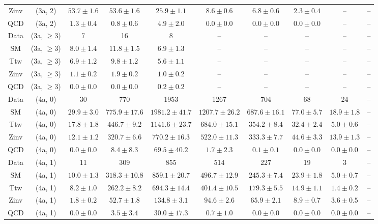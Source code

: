 \begin{table}[h!]
{\begin{tabular}{cccccccccc}
	Zinv & (3a, 2) & $53.7\pm 1.6$ & $53.6\pm 1.6$ & $25.9\pm 1.1$ & $8.6\pm 0.6$ & $6.8\pm 0.6$ & $2.3\pm 0.4$ & -- & -- \\[0.5ex] 
	QCD & (3a, 2) & $1.3\pm 0.4$ & $0.8\pm 0.6$ & $4.9\pm 2.0$ & $0.0\pm 0.0$ & $0.0\pm 0.0$ & $0.0\pm 0.0$ & -- & -- \\[0.5ex] 
	Data & (3a, $\ge3$) & 7 & 16 & 8 & -- & -- & -- & -- & -- \\[0.5ex] 
	SM & (3a, $\ge3$) & $8.0\pm 1.4$ & $11.8\pm 1.5$ & $6.9\pm 1.3$ & -- & -- & -- & -- & -- \\[0.5ex] 
	Ttw & (3a, $\ge3$) & $6.9\pm 1.2$ & $9.8\pm 1.2$ & $5.6\pm 1.1$ & -- & -- & -- & -- & -- \\[0.5ex] 
	Zinv & (3a, $\ge3$) & $1.1\pm 0.2$ & $1.9\pm 0.2$ & $1.0\pm 0.2$ & -- & -- & -- & -- & -- \\[0.5ex] 
	QCD & (3a, $\ge3$) & $0.0\pm 0.0$ & $0.0\pm 0.0$ & $0.2\pm 0.2$ & -- & -- & -- & -- & -- \\[0.5ex] 
	Data & (4a, 0) & 30 & 770 & 1953 & 1267 & 704 & 68 & 24 & -- \\[0.5ex] 
	SM & (4a, 0) & $29.9\pm 3.0$ & $775.9\pm 17.6$ & $1981.2\pm 41.7$ & $1207.7\pm 26.2$ & $687.6\pm 16.1$ & $77.0\pm 5.7$ & $18.9\pm 1.8$ & -- \\[0.5ex] 
	Ttw & (4a, 0) & $17.8\pm 1.8$ & $446.7\pm 9.2$ & $1141.6\pm 23.7$ & $684.0\pm 15.1$ & $354.2\pm 8.4$ & $32.4\pm 2.4$ & $5.0\pm 0.6$ & -- \\[0.5ex] 
	Zinv & (4a, 0) & $12.1\pm 1.2$ & $320.7\pm 6.6$ & $770.2\pm 16.3$ & $522.0\pm 11.3$ & $333.3\pm 7.7$ & $44.6\pm 3.3$ & $13.9\pm 1.3$ & -- \\[0.5ex] 
	QCD & (4a, 0) & $0.0\pm 0.0$ & $8.4\pm 8.3$ & $69.5\pm 40.2$ & $1.7\pm 2.3$ & $0.1\pm 0.1$ & $0.0\pm 0.0$ & $0.0\pm 0.0$ & -- \\[0.5ex] 
	Data & (4a, 1) & 11 & 309 & 855 & 514 & 227 & 19 & 3 & -- \\[0.5ex] 
	SM & (4a, 1) & $10.0\pm 1.3$ & $318.3\pm 10.8$ & $859.1\pm 20.7$ & $496.7\pm 12.9$ & $245.3\pm 7.4$ & $23.9\pm 1.8$ & $5.0\pm 0.7$ & -- \\[0.5ex] 
	Ttw & (4a, 1) & $8.2\pm 1.0$ & $262.2\pm 8.2$ & $694.3\pm 14.4$ & $401.4\pm 10.5$ & $179.3\pm 5.5$ & $14.9\pm 1.1$ & $1.4\pm 0.2$ & -- \\[0.5ex] 
	Zinv & (4a, 1) & $1.8\pm 0.2$ & $52.7\pm 1.8$ & $134.8\pm 3.1$ & $94.6\pm 2.6$ & $65.9\pm 2.1$ & $8.9\pm 0.7$ & $3.6\pm 0.5$ & -- \\[0.5ex] 
	QCD & (4a, 1) & $0.0\pm 0.0$ & $3.5\pm 3.4$ & $30.0\pm 17.3$ & $0.7\pm 1.0$ & $0.0\pm 0.0$ & $0.0\pm 0.0$ & $0.0\pm 0.0$ & -- \\[0.5ex] 

\end{tabular}}
\end{table}
